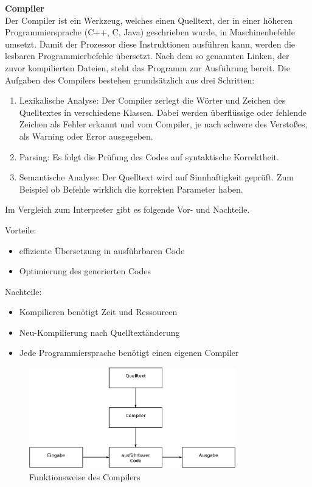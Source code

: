\textbf{Compiler}\\
Der Compiler ist ein Werkzeug, welches einen Quelltext, der in einer höheren Programmiersprache (C++, C, Java) geschrieben wurde, in Maschinenbefehle umsetzt.
 Damit der Prozessor diese Instruktionen ausführen kann, werden die lesbaren Programmierbefehle übersetzt. Nach dem so genannten Linken, der zuvor kompilierten Dateien, steht das Programm zur Ausführung bereit.
Die Aufgaben des Compilers bestehen grundsätzlich aus drei Schritten:\cite{compiler}
\begin{enumerate}
  \item Lexikalische Analyse:
  	Der Compiler zerlegt die Wörter und Zeichen des Quelltextes in verschiedene Klassen. Dabei werden überflüssige oder fehlende Zeichen als Fehler erkannt und vom Compiler, je nach
  schwere des Verstoßes, als Warning oder Error ausgegeben.
  \item Parsing:
  	Es folgt die Prüfung des Codes auf syntaktische Korrektheit.
  \item Semantische Analyse: Der Quelltext wird auf Sinnhaftigkeit geprüft. Zum Beispiel ob Befehle wirklich die korrekten Parameter haben.
\end{enumerate}

Im Vergleich zum Interpreter gibt es folgende Vor- und Nachteile.

Vorteile:
\begin{itemize}
  \item effiziente Übersetzung in ausführbaren Code
  \item Optimierung des generierten Codes
\end{itemize}

Nachteile:
\begin{itemize}
  \item Kompilieren benötigt Zeit und Ressourcen
  \item Neu-Kompilierung nach Quelltextänderung
  \item Jede Programmiersprache benötigt einen eigenen Compiler
\end{itemize}

\begin{figure}[H]
\centering
\includegraphics[width=0.8\textwidth]{Hauptteil/Compiler.eps}
\caption{Funktionsweise des Compilers}\label{fig:compiler}
\end{figure}

